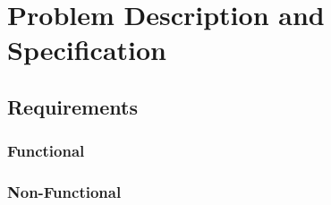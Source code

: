 \documentclass[report.tex]{subfiles}
\begin{document}
\chapter{Problem Description and Specification} %
\label{cha:problem_description_and_specification}
\section{Requirements} %
\label{sec:requirements}
\subsection{Functional} %
\label{sub:functional}

\subsection{Non-Functional} %
\label{sub:non_functional}

\newpage
\end{document}
